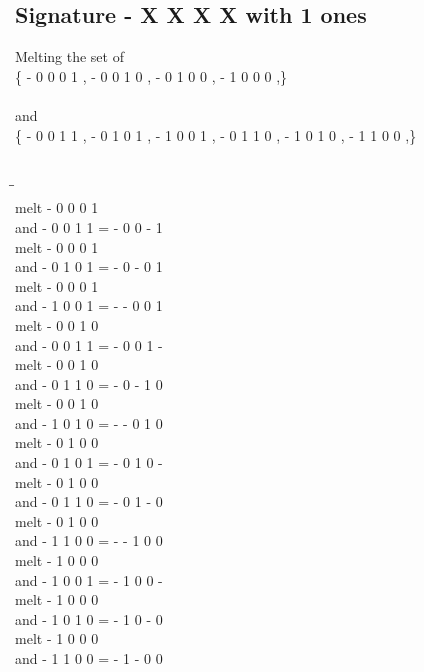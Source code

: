 \documentclass{article}
\begin{document}
\subsection{Signature - X X X X with 1 ones}
Melting the set of\\
\{ -  0  0  0  1 , -  0  0  1  0 , -  0  1  0  0 , -  1  0  0  0 ,\}\\\\
and\\
\{ -  0  0  1  1 , -  0  1  0  1 , -  1  0  0  1 , -  0  1  1  0 , -  1  0  1  0 , -  1  1  0  0 ,\}\\\\
\begin{tabbing}
\hspace{3cm}\=\hspace{3cm}\=\hspace{3cm}\\[1cm]
melt\> -  0  0  0  1 \\
and\> -  0  0  1  1 \>
 =  -  0  0  -  1 \\[1mm]
melt\> -  0  0  0  1 \\
and\> -  0  1  0  1 \>
 =  -  0  -  0  1 \\[1mm]
melt\> -  0  0  0  1 \\
and\> -  1  0  0  1 \>
 =  -  -  0  0  1 \\[1mm]
melt\> -  0  0  1  0 \\
and\> -  0  0  1  1 \>
 =  -  0  0  1  - \\[1mm]
melt\> -  0  0  1  0 \\
and\> -  0  1  1  0 \>
 =  -  0  -  1  0 \\[1mm]
melt\> -  0  0  1  0 \\
and\> -  1  0  1  0 \>
 =  -  -  0  1  0 \\[1mm]
melt\> -  0  1  0  0 \\
and\> -  0  1  0  1 \>
 =  -  0  1  0  - \\[1mm]
melt\> -  0  1  0  0 \\
and\> -  0  1  1  0 \>
 =  -  0  1  -  0 \\[1mm]
melt\> -  0  1  0  0 \\
and\> -  1  1  0  0 \>
 =  -  -  1  0  0 \\[1mm]
melt\> -  1  0  0  0 \\
and\> -  1  0  0  1 \>
 =  -  1  0  0  - \\[1mm]
melt\> -  1  0  0  0 \\
and\> -  1  0  1  0 \>
 =  -  1  0  -  0 \\[1mm]
melt\> -  1  0  0  0 \\
and\> -  1  1  0  0 \>
 =  -  1  -  0  0 \\[1mm]
\end{tabbing}
\newpage
\end{document}
